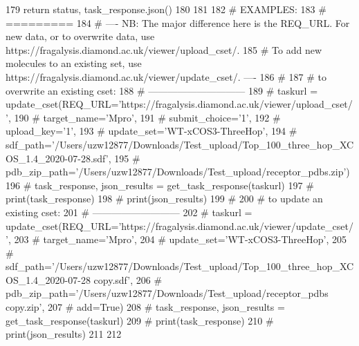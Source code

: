 \begin{DoxyCode}
179     \textcolor{keywordflow}{return} status, task\_response.json()
180 
181 
182 \textcolor{comment}{# EXAMPLES:}
183 \textcolor{comment}{# =========}
184 \textcolor{comment}{# ---- NB: The major difference here is the REQ\_URL. For new data, or to overwrite data, use
       https://fragalysis.diamond.ac.uk/viewer/upload\_cset/.}
185 \textcolor{comment}{#          To add new molecules to an existing set, use
       https://fragalysis.diamond.ac.uk/viewer/update\_cset/. ----}
186 \textcolor{comment}{#}
187 \textcolor{comment}{# to overwrite an existing cset:}
188 \textcolor{comment}{# ------------------------------}
189 \textcolor{comment}{# taskurl = update\_cset(REQ\_URL='https://fragalysis.diamond.ac.uk/viewer/upload\_cset/',}
190 \textcolor{comment}{#                       target\_name='Mpro',}
191 \textcolor{comment}{#                       submit\_choice='1',}
192 \textcolor{comment}{#                       upload\_key='1',}
193 \textcolor{comment}{#                       update\_set='WT-xCOS3-ThreeHop',}
194 \textcolor{comment}{#                      
       sdf\_path='/Users/uzw12877/Downloads/Test\_upload/Top\_100\_three\_hop\_XCOS\_1.4\_2020-07-28.sdf',}
195 \textcolor{comment}{#                       pdb\_zip\_path='/Users/uzw12877/Downloads/Test\_upload/receptor\_pdbs.zip')}
196 \textcolor{comment}{# task\_response, json\_results = get\_task\_response(taskurl)}
197 \textcolor{comment}{# print(task\_response)}
198 \textcolor{comment}{# print(json\_results)}
199 \textcolor{comment}{#}
200 \textcolor{comment}{# to update an existing cset:}
201 \textcolor{comment}{# ---------------------------}
202 \textcolor{comment}{# taskurl = update\_cset(REQ\_URL='https://fragalysis.diamond.ac.uk/viewer/update\_cset/',}
203 \textcolor{comment}{#                       target\_name='Mpro',}
204 \textcolor{comment}{#                       update\_set='WT-xCOS3-ThreeHop',}
205 \textcolor{comment}{#                      
       sdf\_path='/Users/uzw12877/Downloads/Test\_upload/Top\_100\_three\_hop\_XCOS\_1.4\_2020-07-28 copy.sdf',}
206 \textcolor{comment}{#                       pdb\_zip\_path='/Users/uzw12877/Downloads/Test\_upload/receptor\_pdbs copy.zip',}
207 \textcolor{comment}{#                       add=True)}
208 \textcolor{comment}{# task\_response, json\_results = get\_task\_response(taskurl)}
209 \textcolor{comment}{# print(task\_response)}
210 \textcolor{comment}{# print(json\_results)}
211 
212 \end{DoxyCode}
\mbox{\label{namespacefragalysis__api_1_1xcextracter_1_1computed__set__update_a9a7a1666e3c737a48bc3ebfe981adeef}} 
